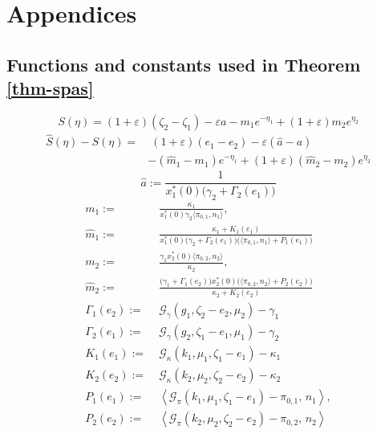\documentclass[journal,twoside,web]{ieeecolor}
\begin{document}
\appendix

\section{Appendices}

\subsection{Functions and constants used in Theorem \ref{thm-spas}}
\label{app-functions+constants}

\begin{equation}
S(\eta)=(1+\varepsilon)(\zeta_2-\zeta_1)-\varepsilon a-m_1e^{-\eta_1}+(1+\varepsilon)m_2e^{\eta_2}
\end{equation}
\begin{align}
\hat S(\eta)-S(\eta)
=&\;
(1+\varepsilon)(e_1-e_2)-\varepsilon(\hat a-a)\nonumber \\ & -(\hat m_1-m_1)e^{-\eta_1}+(1+\varepsilon)(\hat m_2-m_2)e^{\eta_2}
\end{align}
\begin{equation}
\hat a:=\frac{1}{x_1^*(0)\bigl(\gamma_2+\Gamma_2(e_1)\bigr)}
\end{equation}
\begin{align}
m_1:=&\;\frac{\kappa_1}{x_1^*(0)\gamma_2\langle \pi_{0,1},n_1\rangle},
\\ 
\hat m_1:=&\;\frac{\kappa_1+K_1(e_1)}
{x_1^*(0)\bigl(\gamma_2+\Gamma_2(e_1)\bigr)\bigl(\langle \pi_{0,1},n_1\rangle+P_1(e_1)\bigr)} \\ 
m_2:=&\;\frac{\gamma_1x_2^*(0)\langle \pi_{0,2},n_2\rangle}{\kappa_2},\\
\hat m_2:=&\;\frac{\bigl(\gamma_1+\Gamma_1(e_2)\bigr)x_2^*(0)\bigl(\langle \pi_{0,2},n_2\rangle+P_2(e_2)\bigr)}
{\kappa_2+K_2(e_2)} \\ 
\Gamma_1(e_2):=&\;\mathcal{G}_\gamma(g_1,\zeta_2-e_2,\mu_2)-\gamma_1\\
\Gamma_2(e_1):=&\;\mathcal{G}_\gamma(g_2,\zeta_1-e_1,\mu_1)-\gamma_2 \\ 
K_1(e_1):=&\;\mathcal{G}_\kappa(k_1,\mu_1,\zeta_1-e_1)-\kappa_1 \\ 
K_2(e_2):=&\;\mathcal{G}_\kappa(k_2,\mu_2,\zeta_2-e_2)-\kappa_2 \\ 
P_1(e_1):=&\; \left\langle \mathcal{G}_\pi(k_1,\mu_1,\zeta_1-e_1)-\pi_{0,1},\,n_1\right\rangle, \\ 
P_2(e_2):=&\; \left\langle \mathcal{G}_\pi(k_2,\mu_2,\zeta_2-e_2)-\pi_{0,2},\,n_2\right\rangle
\end{align}
\end{document}
